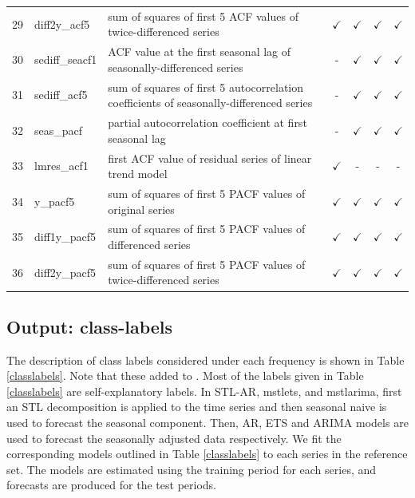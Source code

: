 \documentclass[11pt,a4paper,]{article}
\def\yes{$\checkmark$}
\begin{document}
\begin{table}[!htp]
\begin{tabular}{llp{}cccc}
29 & diff2y\_acf5   & sum of squares of first 5 ACF values of twice-differenced series                        & \yes  & \yes & \yes & \yes \\
30 & sediff\_seacf1 & ACF value at the first seasonal lag of seasonally-differenced series                    & -     & \yes & \yes & \yes\\
31 & sediff\_acf5   & sum of squares of first 5 autocorrelation coefficients of seasonally-differenced series & -     & \yes & \yes & \yes\\
32 & seas\_pacf     & partial autocorrelation coefficient at first seasonal lag & -     & \yes & \yes & \yes\\
33 & lmres\_acf1    & first ACF value of residual series of linear trend model                                & \yes  & - & - & -\\
34 & y\_pacf5       & sum of squares of first 5 PACF values of original series                                & \yes  & \yes & \yes & \yes\\
35 & diff1y\_pacf5  & sum of squares of first 5 PACF values of differenced series                             & \yes  & \yes & \yes & \yes\\
36 & diff2y\_pacf5  & sum of squares of first 5 PACF values of twice-differenced series                       & \yes  & \yes & \yes & \yes\\
\bottomrule
\end{tabular}
\end{table}

\hypertarget{output-class-labels}{%
\subsection{Output: class-labels}\label{output-class-labels}}

The description of class labels considered under each frequency is shown in Table \ref{classlabels}. Note that these added to \textcite{fforms}. Most of the labels given in Table \ref{classlabels} are self-explanatory labels. In STL-AR, mstlets, and mstlarima, first an STL decomposition is applied to the time series and then seasonal naive is used to forecast the seasonal component. Then, AR, ETS and ARIMA models are used to forecast the seasonally adjusted data respectively. We fit the corresponding models outlined in Table \ref{classlabels} to each series in the reference set. The models are estimated using the training period for each series, and forecasts are produced for the test periods.
\end{document}
